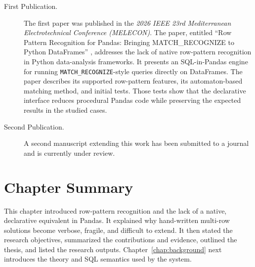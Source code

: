\begin{description}

\item[First Publication.]
The first paper was published in the
\textit{2026 IEEE 23rd Mediterranean Electrotechnical Conference
(MELECON)}.  The paper, entitled ``Row Pattern Recognition for
Pandas: Bringing MATCH\_RECOGNIZE to Python DataFrames''
\cite{lawande2026rpr}, addresses the lack of native row-pattern recognition
in Python data-analysis frameworks.  It presents an SQL-in-Pandas engine for
running \texttt{MATCH\_RECOGNIZE}-style queries directly on DataFrames.  The
paper describes its supported row-pattern features, its automaton-based
matching method,
and initial tests.  Those tests show that the declarative interface reduces
procedural Pandas code while preserving the expected results in the studied
cases.

\item[Second Publication.]
A second manuscript extending this work has been submitted to a journal
and is currently under review.

\end{description}

\section{Chapter Summary}
\label{sec:intro-summary}

This chapter introduced row-pattern recognition and the lack of a native,
declarative equivalent in Pandas.  It explained why hand-written multi-row
solutions become verbose, fragile, and difficult to extend.  It then stated
the research objectives, summarized the contributions and evidence, outlined
the thesis, and listed the research outputs.  Chapter~\ref{chap:background}
next introduces the theory and SQL semantics used by the system.
